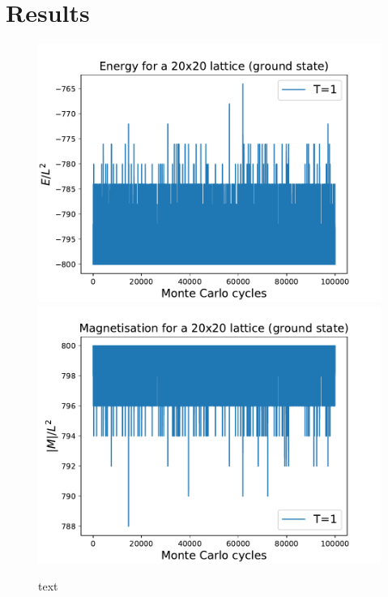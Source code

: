 \documentclass{emulateapj}
\begin{document}
\section{Results}
\label{sec:results}

\begin{figure}[H]
{{\includegraphics[scale=0.53]{EofMCC-GS-T1-L20-1e5.pdf}}
}\qquad
{{\includegraphics[scale=0.53]{MofMCC-GS-T1-L20-1e5.pdf}}
}\qquad
\caption{text}
\label{fig:GS}
\end{figure}
\end{document}
